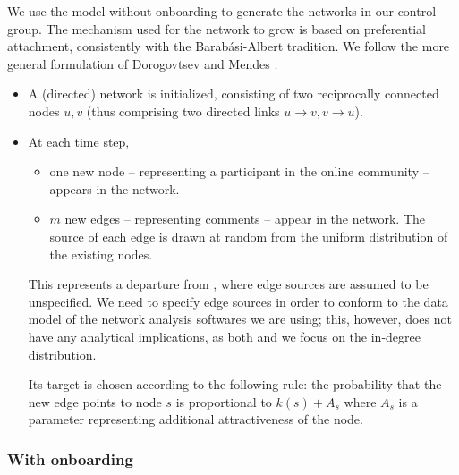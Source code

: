 \documentclass{bmcart}
\begin{document}
We use the model without onboarding to generate the networks in our control group. The mechanism used for the network to grow is based on preferential attachment, consistently with the Barab\'asi-Albert tradition. We follow the more general formulation of Dorogovtsev and Mendes \cite{dorogovtsev2002evolution}.
\begin{itemize}
\item A (directed) network is initialized, consisting of two reciprocally connected nodes $u,v$ (thus comprising two directed links $u \to v, v \to u$).
\item At each time step,
	\begin{itemize}
    \item[] one new node -- representing a participant in
    the online community -- appears in the network. 
	\item[] $m$ new edges --  representing comments -- 
    appear in the network. The source of each edge is
    drawn at random from the uniform distribution of the
    existing nodes.
	\end{itemize}

This represents a departure from \cite{dorogovtsev2002evolution}, where edge sources are assumed to be unspecified. We need to specify edge sources in order to conform to the data model of the network analysis softwares we are using; this, however, does not have any analytical implications, as both \cite{dorogovtsev2002evolution} and we focus on the in-degree distribution.

Its target is chosen according to the following rule: the probability that the new edge points to node $s$ is proportional to $k(s) + A_s$ where $A_s$ is a parameter representing additional attractiveness of the node.
\end{itemize}

\subsubsection{With onboarding}
\end{document}
